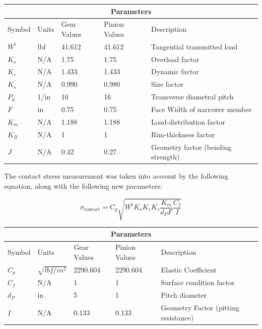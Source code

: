 \documentclass[letterpaper,12pt]{article}
\begin{document}
\begin{center}
	\begin{tabular}{ |p{2cm}||p{2cm}|p{2.3cm}|p{2.3cm}|p{6cm}|  }
		\hline
		\multicolumn{5}{|c|}{Parameters} \\
		\hline
		Symbol & Units & Gear Values & Pinion Values & Description\\
		\hline
		$W^t$ & lbf & 41.612 & 41.612 & Tangential transmitted load\\
		$K_o$ & N/A & 1.75 & 1.75 & Overload factor\\
		$K_v$ & N/A & 1.433 & 1.433 & Dynamic factor\\
		$K_s$ & N/A & 0.990 & 0.980 & Size factor\\
		$P_{d}$ & 1/in & 16 & 16 & Transverse diametral pitch\\
		$F$ & in & 0.75 & 0.75 & Face Width of narrower member\\
		$K_m$ & N/A & 1.188 & 1.188 & Load-distribution factor\\
		$K_{B}$ & N/A & 1 & 1 & Rim-thickness factor\\
		$J$ & N/A & 0.42 & 0.27 & Geometry factor (bending strength)\\
		\hline
	\end{tabular}
\end{center}

\noindent The contact stress measurement was taken into account by the following equation, along with the following new parameters:

\begin{equation}
\sigma_{\text{contact}} = C_{p}\sqrt{W^t K_o K_v K_s \frac{K_m}{d_P F}\frac{C_f}{I}}
\end{equation}

\begin{center}
	\begin{tabular}{ |p{2cm}||p{2cm}|p{2.3cm}|p{2.3cm}|p{6cm}|  }
		\hline
		\multicolumn{5}{|c|}{Parameters} \\
		\hline
		Symbol & Units & Gear Values & Pinion Values & Description\\
		\hline
		$C_p$ & $\sqrt{lbf/in^2}$ & 2290.604 & 2290.604 & Elastic Coefficient\\
		$C_f$ & N/A & 1 & 1 & Surface condition factor\\
		$d_P$ & in & 5 & 1 & Pitch diameter\\
		$I$ & N/A & 0.133 & 0.133 & Geometry Factor (pitting resistance)\\
		\hline
	\end{tabular}
\end{center}
\end{document}

